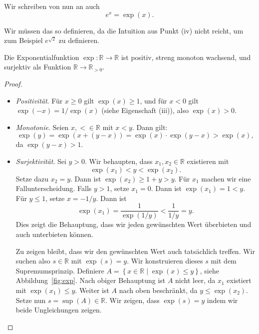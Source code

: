 \documentclass[../main.tex]{subfiles}
\begin{document}
\begin{notation}
  Wir schreiben von nun an auch
  \[
    e^x = \exp(x).
  \]
\end{notation}

Wir müssen das so 
definieren, da die Intuition aus
Punkt (iv) nicht reicht, um zum Beispiel
$e^{\sqrt 2}$ zu definieren.

\begin{proposition*}
  Die Exponentialfunktion $\exp \colon \mathbb{R} \to \mathbb{R}$ 
  ist positiv, streng monoton wachsend, und surjektiv
  als Funktion $\mathbb{R} \to \mathbb{R}_{>0}$.
\end{proposition*}

\begin{proof}
  \leavevmode
  \begin{itemize}
    \item \emph{Positivität}. 
      Für $x \geq 0$ gilt $\exp(x) \geq 1$,
      und für $x < 0 $ gilt $\exp(-x) = 1/\exp(x)$
      (siehe Eigenschaft (iii)), also
      $\exp(x) > 0$.
    \item \emph{Monotonie}. 
      Seien $x, < \in \mathbb{R}$ mit $x < y$.
      Dann gilt:
      \[
        \exp(y) = \exp(x + (y - x))
        = \exp(x) \cdot \exp(y-x)
        > \exp(x),
      \]
      da $\exp(y-x) > 1$.
    \item \emph{Surjektivität}.
      Sei $y > 0$. Wir behaupten,
      dass $x_1, x_2 \in \mathbb{R}$ existieren mit 
      \[
        \exp(x_1) < y < \exp(x_2).
      \]
      Setze dazu $x_2 = y$. Dann ist
        $\exp(x_2) \geq 1 + y > y$.
      Für $x_1$ machen wir eine Fallunterscheidung.
      Falls $y > 1$, setze $x_1 = 0$. Dann ist
      $\exp(x_1) = 1 < y$. Für $y \leq 1$, setze
      $x = -1/y$. Dann ist
       \[
         \exp(x_1) = \frac{1}{\exp(1/y)} < \frac{1}{1/y} = y.
      \]
      Dies zeigt die Behauptung, dass wir jeden gewünschten
      Wert überbieten und auch unterbieten können.

      Zu zeigen bleibt, dass wir den gewünschten Wert auch
      tatsächlich treffen.
      Wir suchen also $s \in \mathbb{R}$ mit $\exp(s) = y$.
      Wir konstruieren dieses $s$ mit dem Supremumsprinzip.
      Definiere
      $A = \left\{x \in \mathbb{R} \mid \exp(x) \leq y\right\}$,
      siehe Abbildung~\ref{fig:exp}.
      Nach obiger Behauptung ist $A$ nicht leer,
      da $x_1$ existiert mit $\exp(x_1) \leq y$.
      Weiter ist $A$ nach oben beschränkt,
      da $y \leq \exp(x_2)$.
      Setze nun $s = \sup(A) \in \mathbb{R}$.
      Wir zeigen, dass $\exp(s) = y$ indem wir
      beide Ungleichungen zeigen.


\end{itemize}
\end{proof}
\end{document}

